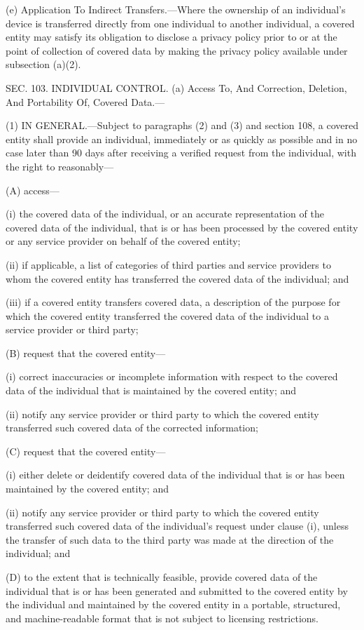 (e) Application To Indirect Transfers.—Where the ownership of an individual’s device is transferred directly from one individual to another individual, a covered entity may satisfy its obligation to disclose a privacy policy prior to or at the point of collection of covered data by making the privacy policy available under subsection (a)(2).


SEC. 103. INDIVIDUAL CONTROL.
(a) Access To, And Correction, Deletion, And Portability Of, Covered Data.—

(1) IN GENERAL.—Subject to paragraphs (2) and (3) and section 108, a covered entity shall provide an individual, immediately or as quickly as possible and in no case later than 90 days after receiving a verified request from the individual, with the right to reasonably—

(A) access—

(i) the covered data of the individual, or an accurate representation of the covered data of the individual, that is or has been processed by the covered entity or any service provider on behalf of the covered entity;

(ii) if applicable, a list of categories of third parties and service providers to whom the covered entity has transferred the covered data of the individual; and

(iii) if a covered entity transfers covered data, a description of the purpose for which the covered entity transferred the covered data of the individual to a service provider or third party;

(B) request that the covered entity—

(i) correct inaccuracies or incomplete information with respect to the covered data of the individual that is maintained by the covered entity; and

(ii) notify any service provider or third party to which the covered entity transferred such covered data of the corrected information;

(C) request that the covered entity—

(i) either delete or deidentify covered data of the individual that is or has been maintained by the covered entity; and

(ii) notify any service provider or third party to which the covered entity transferred such covered data of the individual’s request under clause (i), unless the transfer of such data to the third party was made at the direction of the individual; and

(D) to the extent that is technically feasible, provide covered data of the individual that is or has been generated and submitted to the covered entity by the individual and maintained by the covered entity in a portable, structured, and machine-readable format that is not subject to licensing restrictions.

